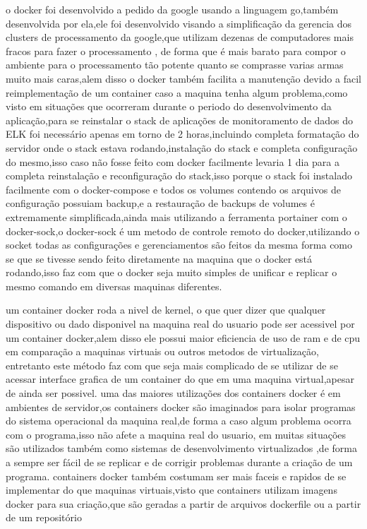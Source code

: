 \documentclass[
	12pt,				%
	openright,			%
	oneside,			%
	a4paper,			%
	english,			%
	french,				%
	spanish,			%
	brazil,				%
	]{abntex2}
\begin{document}
o docker foi desenvolvido a pedido da google usando a linguagem go,também desenvolvida por ela,ele foi desenvolvido visando a simplificação da gerencia dos clusters de processamento da google,que utilizam dezenas de computadores mais fracos para fazer o processamento , de forma que é mais barato para compor o ambiente para o processamento tão potente quanto se comprasse varias armas muito mais caras,alem disso o docker também facilita a manutenção devido a facil reimplementação de um container caso a maquina tenha algum problema,como visto em situações que ocorreram durante o periodo do desenvolvimento da aplicação,para se reinstalar o stack de aplicações de monitoramento de dados do ELK  foi necessário apenas em torno de 2 horas,incluindo completa formatação do servidor onde o stack estava rodando,instalação do stack e completa configuração do mesmo,isso caso não fosse feito com docker facilmente levaria 1 dia para a completa reinstalação e reconfiguração do stack,isso porque o stack foi instalado facilmente com o docker-compose e todos os volumes contendo os arquivos de configuração possuiam backup,e a restauração de backups de volumes é extremamente simplificada,ainda mais utilizando a ferramenta portainer  com o docker-sock,o docker-sock é um metodo de controle remoto do docker,utilizando o socket todas as configurações e gerenciamentos são feitos da mesma forma como se que se tivesse sendo feito diretamente na maquina que o docker está rodando,isso faz com que o docker seja muito simples de unificar e replicar o mesmo comando em diversas maquinas diferentes.
\cite{dockerdoc}

um container docker roda a nivel de kernel, o que quer dizer que qualquer dispositivo ou dado disponivel na maquina real do usuario pode ser acessivel por um container docker,alem disso ele possui maior eficiencia de uso de ram e de cpu em comparação a maquinas virtuais ou outros metodos de virtualização, entretanto este método faz com que seja mais complicado de se utilizar de se acessar interface grafica de um container do que em uma maquina virtual,apesar de ainda ser possivel.
uma das maiores utilizações dos containers docker é em ambientes de servidor,os containers docker são imaginados para isolar programas do sistema operacional da maquina real,de forma a caso algum problema ocorra com o programa,isso não afete a maquina real do usuario, em muitas situações são utilizados também como sistemas de desenvolvimento virtualizados ,de forma a sempre ser fácil de se replicar e de corrigir problemas durante a criação de um programa.
containers docker também costumam ser mais faceis e rapidos de se implementar do que maquinas virtuais,visto que containers utilizam imagens docker para sua criação,que são geradas a partir de arquivos dockerfile ou a partir de um repositório
\end{document}

